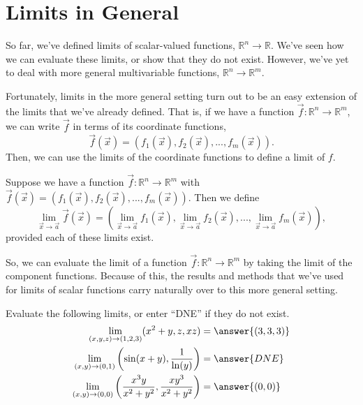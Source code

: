\documentclass{ximera}
\begin{document}
\section*{Limits in General}

So far, we've defined limits of scalar-valued functions, $\mathbb{R}^n\rightarrow\mathbb{R}$. We've seen how we can evaluate these limits, or show that they do not exist. However, we've yet to deal with more general multivariable functions, $\mathbb{R}^n\rightarrow\mathbb{R}^m$.

Fortunately, limits in the more general setting turn out to be an easy extension of the limits that we've already defined. That is, if we have a function $\vec{f}:\mathbb{R}^n\rightarrow\mathbb{R}^m$, we can write $\vec{f}$ in terms of its coordinate functions,
\[
\vec{f}(\vec{x}) = (f_1(\vec{x}), f_2(\vec{x}),...,f_m(\vec{x})).
\]
Then, we can use the limits of the coordinate functions to define a limit of $f$.

\begin{definition}
Suppose we have a function $\vec{f}:\mathbb{R}^n\rightarrow\mathbb{R}^m$ with $\vec{f}(\vec{x}) = (f_1(\vec{x}), f_2(\vec{x}),...,f_m(\vec{x}))$. Then we define
\[
\lim_{\vec{x}\rightarrow\vec{a}}\vec{f}(\vec{x}) = \left(\lim_{\vec{x}\rightarrow\vec{a}}f_1(\vec{x}), \lim_{\vec{x}\rightarrow\vec{a}}f_2(\vec{x}),...,\lim_{\vec{x}\rightarrow\vec{a}}f_m(\vec{x})\right),
\]
provided each of these limits exist.
\end{definition}

So, we can evaluate the limit of a function $\vec{f}:\mathbb{R}^n\rightarrow\mathbb{R}^m$ by taking the limit of the component functions. Because of this, the results and methods that we've used for limits of scalar functions carry naturally over to this more general setting.

\begin{example}
Evaluate the following limits, or enter ``DNE'' if they do not exist.
\begin{align*}
\lim_{(x,y,z)\rightarrow (1,2,3)}(x^2+y, z, xz) &= \answer{(3,3,3)}\\
\lim_{(x,y)\rightarrow(0,1)}\left(\sin(x+y), \frac{1}{\ln(y)}\right) &= \answer{DNE}\\
\lim_{(x,y)\rightarrow(0,0)}\left(\frac{x^3y}{x^2+y^2}, \frac{xy^3}{x^2+y^2}\right) &= \answer{(0,0)}
\end{align*}
\end{example}
\end{document}
